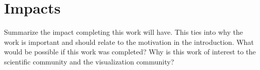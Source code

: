 \section{Impacts}
\label{sec:impact}

Summarize the impact completing this work will have. This ties into why the
work is important and should relate to the motivation in the introduction.
What would be possible if this work was completed? Why is this work of interest
to the scientific community and the visualization community?
